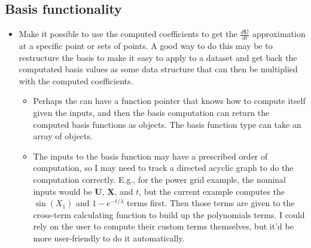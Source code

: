 \documentclass{article}
\let\vec\mathbf
\def\lstinline#1{}%
\begin{document}
\subsection{Basis functionality}
\begin{itemize}
    \item Make it possible to use the computed coefficients to get the
      $\frac{d\vec{U}}{dt}$ approximation at a specific point or sets of points.
      A good way to do this may be to restructure the basis to make it easy to
      apply to a dataset and get back the computated basis values as some data
      structure that can then be multiplied with the computed coefficients.
    \begin{itemize}
        \item Perhaps the \lstinline{Variable} can have a function pointer that knows
          how to compute itself given the inputs, and then the basis computation can
          return the computed basis functions as \lstinline{Variable} objects. The
          basis function type can take an array of \lstinline{Variable} objects.
        \item The inputs to the basis function may have a prescribed order of
          computation, so I may need to track a directed acyclic graph to do the
          computation correctly. E.g., for the power grid example, the nominal
          inputs would be $\vec{U}$, $\vec{X}$, and $t$, but the current example
          computes the $\sin(X_1)$ and $1-e^{-t/\lambda}$ terms first. Then
          those terms are given to the cross-term calculating function to build
          up the polynomials terms. I could rely on the user to compute their
          custom terms themselves, but it'd be more user-friendly to do it
          automatically.
    \end{itemize}
\end{itemize}
\end{document}
